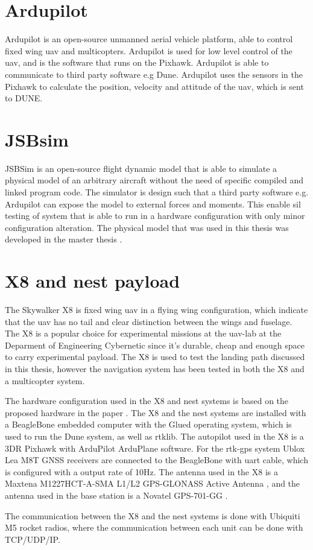 \section{Ardupilot}\label{ss:ardupilot}
Ardupilot is an open-source unmanned aerial vehicle platform, able to control fixed wing \gls{uav} and multicopters. Ardupilot is used for low level control of the \gls{uav}, and is the software that runs on the Pixhawk. Ardupilot is able to communicate to third party software e.g Dune. Ardupilot uses the sensors in the Pixhawk to calculate the position, velocity and attitude of the \gls{uav}, which is sent to DUNE.
\section{JSBsim}
JSBSim \citep{berndt2004jsbsim} is an open-source flight dynamic model that is able to simulate a physical model of an arbitrary aircraft without the need of specific compiled and linked program code. The simulator is design such that a third party software e.g. Ardupilot can expose the model to external forces and moments. This enable \gls{sil} testing of system that is able to run in a hardware configuration with only minor configuration alteration. The physical model that was used in this thesis was developed in the master thesis \citep{Gryte}.
\section{X8 and nest payload}
The Skywalker X8 is fixed wing \gls{uav} in a flying wing configuration, which indicate that the \gls{uav} has no tail and clear distinction between the wings and fuselage. The X8 is a popular choice for experimental missions at the \gls{uav}-lab at the Deparment of Engineering Cybernetic since it's durable, cheap and enough space to carry experimental payload. The X8 is used to test the landing path discussed in this thesis, however the navigation system has been tested in both the X8 and a multicopter system.

The hardware configuration used in the X8 and nest systems is based on the proposed hardware in the paper \citep{zolich2015unmanned}. The X8 and the nest systems are installed with a BeagleBone embedded computer with the Glued operating system, which is used to run the Dune system, as well as rtklib. The autopilot used in the X8 is a 3DR Pixhawk with ArduPilot ArduPlane software. For the \gls{rtk-gps} system Ublox Lea M8T GNSS receivers \citep{UbloxDataSheet,UbloxReceiverDescription} are connected to the BeagleBone with uart cable, which is configured with a output rate of 10Hz. The antenna used in the X8 is a Maxtena M1227HCT-A-SMA L1/L2 GPS-GLONASS Active Antenna \citep{maxtena}, and the antenna used in the base station is a Novatel GPS-701-GG \citep{novatel}.

The communication between the X8 and the nest systems is done with Ubiquiti M5 rocket \citep{rocketM5} radios, where the communication between each unit can be done with TCP/UDP/IP.
\cleardoublepage